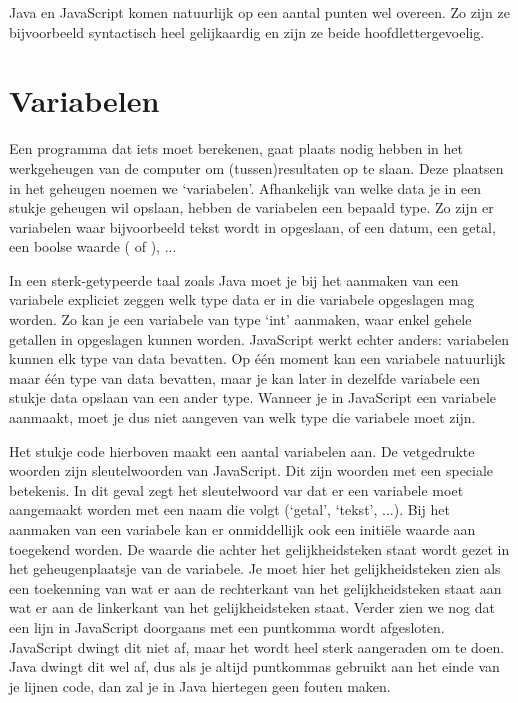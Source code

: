 Java en JavaScript komen natuurlijk op een aantal punten wel overeen. Zo zijn ze bijvoorbeeld syntactisch heel gelijkaardig en zijn ze beide hoofdlettergevoelig.

\section{Variabelen}

Een programma dat iets moet berekenen, gaat plaats nodig hebben in het werkgeheugen van de computer om (tussen)resultaten op te slaan. Deze plaatsen in het geheugen noemen we `variabelen'. Afhankelijk van welke data je in een stukje geheugen wil opslaan, hebben de variabelen een bepaald type. Zo zijn er variabelen waar bijvoorbeeld tekst wordt in opgeslaan, of een datum, een getal, een boolse waarde ( of ), ...

In een sterk-getypeerde taal zoals Java moet je bij het aanmaken van een variabele expliciet zeggen welk type data er in die variabele opgeslagen mag worden. Zo kan je een variabele van type `int' aanmaken, waar enkel gehele getallen in opgeslagen kunnen worden. JavaScript werkt echter anders: variabelen kunnen elk type van data bevatten. Op \'e\'en moment kan een variabele natuurlijk maar \'e\'en type van data bevatten, maar je kan later in dezelfde variabele een stukje data opslaan van een ander type. Wanneer je in JavaScript een variabele aanmaakt, moet je dus niet aangeven van welk type die variabele moet zijn.


Het stukje code hierboven maakt een aantal variabelen aan. De vetgedrukte woorden zijn sleutelwoorden van JavaScript. Dit zijn woorden met een speciale betekenis. In dit geval zegt het sleutelwoord var dat er een variabele moet aangemaakt worden met een naam die volgt (`getal', `tekst', ...). Bij het aanmaken van een variabele kan er onmiddellijk ook een initi\"ele waarde aan toegekend worden. De waarde die achter het gelijkheidsteken staat wordt gezet in het geheugenplaatsje van de variabele. Je moet hier het gelijkheidsteken zien als een toekenning van wat er aan de rechterkant van het gelijkheidsteken staat aan wat er aan de linkerkant van het gelijkheidsteken staat. Verder zien we nog dat een lijn in JavaScript doorgaans met een puntkomma wordt afgesloten. JavaScript dwingt dit niet af, maar het wordt heel sterk aangeraden om te doen. Java dwingt dit wel af, dus als je altijd puntkommas gebruikt aan het einde van je lijnen code, dan zal je in Java hiertegen geen fouten maken.

